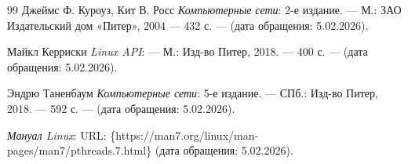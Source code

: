 \renewcommand{\bibname}{СПИСОК ИСПОЛЬЗОВАННЫХ ИСТОЧНИКОВ}
\begin{thebibliography}{99}
	Джеймс Ф. Куроуз, Кит В. Росс
	\textit{Компьютерные сети}: 2-е издание. ---
	М.: ЗАО Издательский дом «Питер», 2004 --- 432 с. --- (дата обращения: 5.02.2026).
	
	Майкл Керриски
	\textit{Linux API}: ---
	М.: Изд-во Питер, 2018. --- 400 с. --- (дата обращения: 5.02.2026).
	
	Эндрю Таненбаум
	\textit{Компьютерные сети}: 5-е издание. ---
	СПб.: Изд-во Питер, 2018. --- 592 с. --- (дата обращения: 5.02.2026).
	
	\textit{Мануал Linux}: 
    URL: \{https://man7.org/linux/man-pages/man7/pthreads.7.html\} (дата обращения: 5.02.2026).
	
\end{thebibliography}
